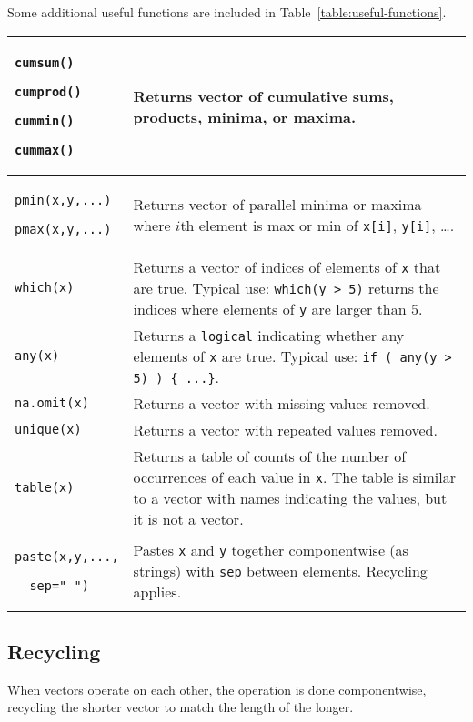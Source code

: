 Some additional useful functions are included in Table~\ref{table:useful-functions}.

\begin{table}
\caption{Some useful \R\ functions.}
\label{table:useful-functions}%
\begin{center}
\UndefineShortVerb{\&}
  \begin{longtable}{|p{1.2in}|p{3.5in}|}
  \hline
  \verb!cumsum()!

  \verb!cumprod()!

  \verb!cummin()!

  \verb!cummax()!
  &
  Returns vector of cumulative sums, products, minima, or maxima.
  \\ \hline
  \verb!pmin(x,y,...)!

  \verb!pmax(x,y,...)!
  &
  Returns vector of parallel minima or maxima where $i$th element is
  max or min of \verb!x[i]!, \verb!y[i]!, \dots.
  \\ \hline
  \verb!which(x)! 
  &
  Returns a vector of indices of elements of \verb!x! that are true.
  Typical use: \verb!which(y > 5)! returns the indices where elements
  of \verb&y& are larger than 5.
  \\ \hline
  \verb!any(x)! 
  &
  Returns a \verb!logical! indicating whether any elements of \verb!x! 
  are true.
  Typical use: \verb!if ( any(y > 5) ) { ...}!.
  \\ \hline
  \verb!na.omit(x)! & Returns a vector with missing values removed.
  \\ \hline
  \verb!unique(x)! & Returns a vector with repeated values removed.
  \\ \hline
  \verb!table(x)! & Returns a table of counts of the number of 
  occurrences of each value in \verb!x!.  The table is similar
  to a vector with names indicating the values, but it is not a vector.
  \\ \hline
  \verb!paste(x,y,...,!
  
  \verb!  sep=" ")! 
  & Pastes \verb!x! and \verb!y! together
  componentwise (as strings) with \verb!sep! between elements.
  Recycling applies.
  \\ \hline
  \end{longtable}
\DefineShortVerb{\&}
\end{center}
\end{table}


\subsection{Recycling}
%
When vectors operate on each other, the operation is done componentwise, 
recycling the shorter vector to match the length of the longer.

